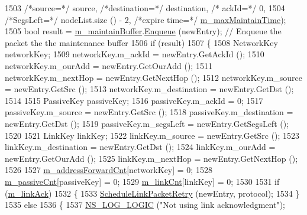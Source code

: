 \begin{DoxyCode}
1503                                                   \textcolor{comment}{/*source=*/} source, \textcolor{comment}{/*destination=*/} destination, \textcolor{comment}{/*
      ackId=*/} 0,
1504                                                   \textcolor{comment}{/*SegsLeft=*/} nodeList.size () - 2, \textcolor{comment}{/*expire time=*/} 
      \hyperlink{classns3_1_1dsr_1_1DsrRouting_ac6b1dffa9665af0d6a71aa7b947962ee}{m\_maxMaintainTime});
1505           \textcolor{keywordtype}{bool} result = \hyperlink{classns3_1_1dsr_1_1DsrRouting_ac9d28a64437fbe20a4228c9811f9fc27}{m\_maintainBuffer}.\hyperlink{classns3_1_1dsr_1_1DsrMaintainBuffer_a8ec30b5b9b0f6af36e61867327a47717}{Enqueue} (newEntry);       \textcolor{comment}{// Enqueue the
       packet the the maintenance buffer}
1506           \textcolor{keywordflow}{if} (result)
1507             \{
1508               NetworkKey networkKey;
1509               networkKey.m\_ackId = newEntry.GetAckId ();
1510               networkKey.m\_ourAdd = newEntry.GetOurAdd ();
1511               networkKey.m\_nextHop = newEntry.GetNextHop ();
1512               networkKey.m\_source = newEntry.GetSrc ();
1513               networkKey.m\_destination = newEntry.GetDst ();
1514 
1515               PassiveKey passiveKey;
1516               passiveKey.m\_ackId = 0;
1517               passiveKey.m\_source = newEntry.GetSrc ();
1518               passiveKey.m\_destination = newEntry.GetDst ();
1519               passiveKey.m\_segsLeft = newEntry.GetSegsLeft ();
1520 
1521               LinkKey linkKey;
1522               linkKey.m\_source = newEntry.GetSrc ();
1523               linkKey.m\_destination = newEntry.GetDst ();
1524               linkKey.m\_ourAdd = newEntry.GetOurAdd ();
1525               linkKey.m\_nextHop = newEntry.GetNextHop ();
1526 
1527               \hyperlink{classns3_1_1dsr_1_1DsrRouting_a5042f7e5df0470025fdb6023fcc24411}{m\_addressForwardCnt}[networkKey] = 0;
1528               \hyperlink{classns3_1_1dsr_1_1DsrRouting_a7fec404d680459aab2b40941a950502d}{m\_passiveCnt}[passiveKey] = 0;
1529               \hyperlink{classns3_1_1dsr_1_1DsrRouting_a85ba159639f9bc13b3d8890458128a79}{m\_linkCnt}[linkKey] = 0;
1530 
1531               \textcolor{keywordflow}{if} (\hyperlink{classns3_1_1dsr_1_1DsrRouting_a216a52d8b579a034df948765d941d3a4}{m\_linkAck})
1532                 \{
1533                   \hyperlink{classns3_1_1dsr_1_1DsrRouting_a947d831bc0964240b1a41b3a09832eff}{ScheduleLinkPacketRetry} (newEntry, protocol);
1534                 \}
1535               \textcolor{keywordflow}{else}
1536                 \{
1537                   \hyperlink{group__logging_ga88acd260151caf2db9c0fc84997f45ce}{NS\_LOG\_LOGIC} (\textcolor{stringliteral}{"Not using link acknowledgment"});

\end{DoxyCode}
